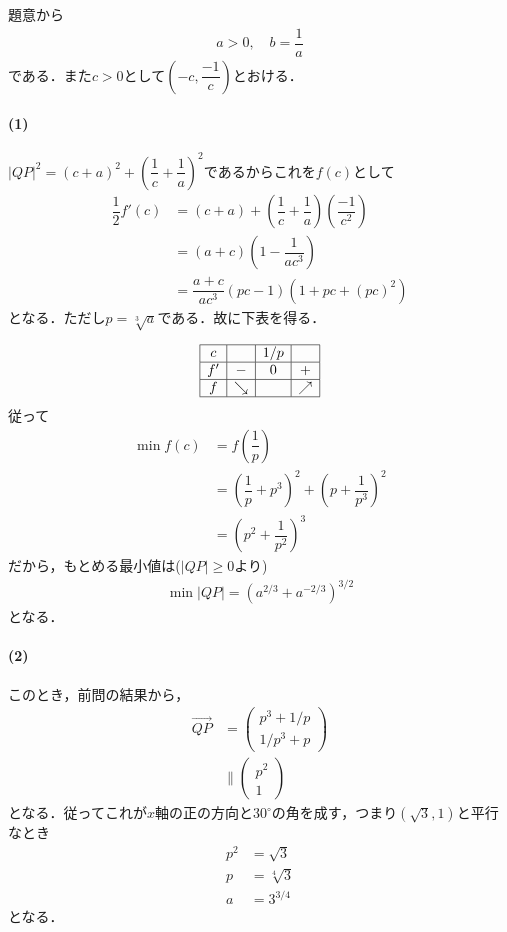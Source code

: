 \documentclass[../../main.tex]{subfiles}
\begin{document}
題意から
\begin{align}
  a>0, \quad
  b=\dfrac{1}{a}
\end{align}
である．また$c>0$として$\left(-c,\dfrac{-1}{c}\right)$とおける．

\paragraph{(1)}

$|QP|^2=(c+a)^2+\left(\dfrac{1}{c}+\dfrac{1}{a}\right)^2$であるからこれを$f(c)$として
\begin{align}
  \dfrac{1}{2}f'(c)&=(c+a)+\left(\dfrac{1}{c}+\dfrac{1}{a}\right)\left(\dfrac{-1}{c^2}\right)  \\
  &=(a+c)\left(1-\dfrac{1}{ac^3}\right)  \\
  &=\dfrac{a+c}{ac^3}{(pc-1)\left(1+pc+(pc)^2\right)}
\end{align}
となる．ただし$p=\sqrt[3]{a}$である．故に下表を得る．

\begin{align}
  \begin{array}{|c|c|c|c|} \hline
    c  &   &  1/p   &      \\ \hline
    f'  & - &   0     & +     \\ \hline
    f  &\searrow&         &\nearrow  \\ \hline
  \end{array}
\end{align}
従って
\begin{align}
  \min f(c)&=f\left(\dfrac{1}{p}\right) \\
  &=\left(\dfrac{1}{p}+p^3\right)^2+\left(p+\dfrac{1}{p^3}\right)^2  \\
  &=\left(p^2+\dfrac{1}{p^2}\right)^3
\end{align}
だから，もとめる最小値は($|QP|\ge0$より)
\begin{align}
  \min|QP|=(a^{2/3}+a^{-2/3})^{3/2} \tag{答}
\end{align}
となる．

\paragraph{(2)}
このとき，前問の結果から，
\begin{align}
  \overrightarrow{QP}&=
  \begin{pmatrix}p^3+1/p\\1/p^3+p
  \end{pmatrix}  \\
  &\parallel
  \begin{pmatrix}p^2\\1
  \end{pmatrix}
\end{align}
となる．従ってこれが$x$軸の正の方向と$30^\circ$の角を成す，つまり$(\sqrt{3},1)$と平行なとき
\begin{align}
  p^2&=\sqrt{3}　\\
  p&=\sqrt[4]{3} \\
  a&=3^{3/4}\tag{答}
\end{align}
となる．
\newpage
\end{document}
